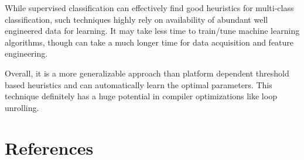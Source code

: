 \documentclass[]{sig-alternate}
\begin{document}
While supervised classification can effectively find good heuristics for multi-class classification, such techniques highly rely on availability of abundant well engineered data for learning. It may take less time to train/tune machine learning algorithms, though can take a much longer time for data acquisition and feature engineering.

Overall, it is a more generalizable approach than platform dependent threshold based heuristics and can automatically learn the optimal parameters. This technique definitely has a huge potential in compiler optimizations like loop unrolling.

\section{References}
\label{sec:References}
%

\begin{scriptsize}
  
\end{scriptsize}
\end{document}
